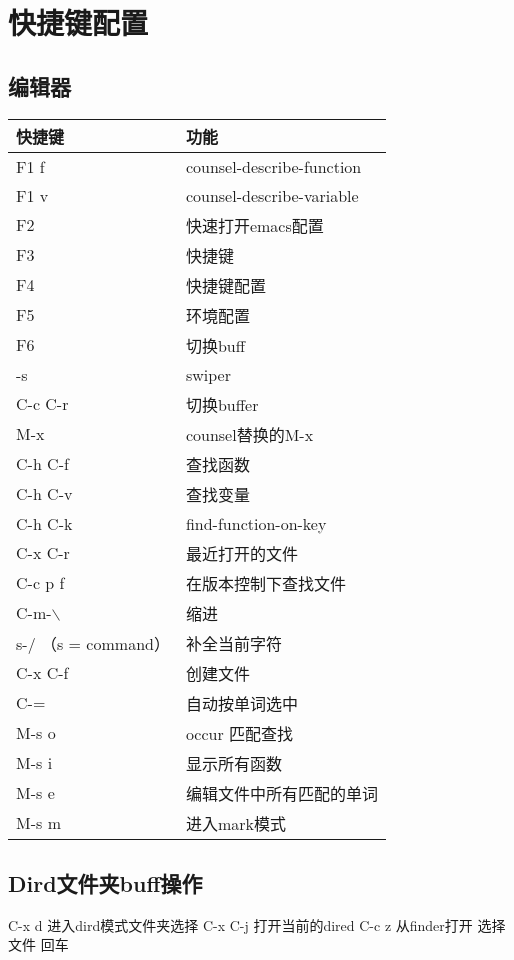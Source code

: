 \documentclass[11pt]{article}
\author{zijian fang}
\date{\today}
\title{}
\begin{document}
\tableofcontents

\section{快捷键配置}
\label{sec:org585a429}

\subsection{编辑器}
\label{sec:org83d6e0d}

\begin{center}
\begin{tabular}{ll}
快捷键 & 功能\\
\hline
F1 f & counsel-describe-function\\
F1 v & counsel-describe-variable\\
F2 & 快速打开emacs配置\\
F3 & 快捷键\\
F4 & 快捷键配置\\
F5 & 环境配置\\
F6 & 切换buff\\
\C-s & swiper\\
C-c C-r & 切换buffer\\
M-x & counsel替换的M-x\\
C-h C-f & 查找函数\\
C-h C-v & 查找变量\\
C-h C-k & find-function-on-key\\
C-x C-r & 最近打开的文件\\
C-c p f & 在版本控制下查找文件\\
C-m-$\backslash$ & 缩进\\
s-/ （s = command） & 补全当前字符\\
C-x C-f & 创建文件\\
C-= & 自动按单词选中\\
M-s o & occur 匹配查找\\
M-s i & 显示所有函数\\
M-s e & 编辑文件中所有匹配的单词\\
M-s m & 进入mark模式\\
\end{tabular}
\end{center}

\subsection{Dird文件夹buff操作}
\label{sec:org9a100eb}
C-x d 进入dird模式文件夹选择
C-x C-j 打开当前的dired
C-c z 从finder打开
选择文件 回车
\end{document}
